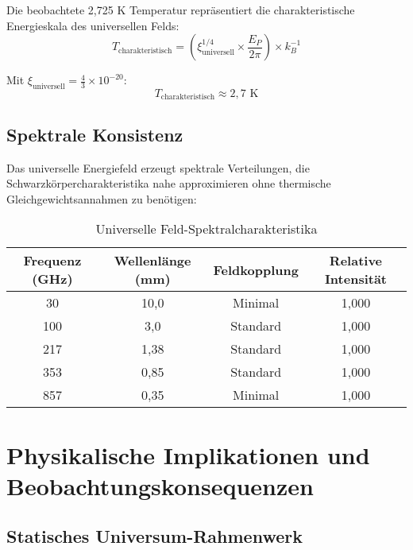 \documentclass[12pt,a4paper]{article}
\begin{document}
	Die beobachtete 2{,}725 K Temperatur repr\"asentiert die charakteristische Energieskala des universellen Felds:
	\begin{equation}
		T_{\text{charakteristisch}} = \left(\xi_{\text{universell}}^{1/4} \times \frac{E_P}{2\pi}\right) \times k_B^{-1}
	\end{equation}
	
	Mit $\xi_{\text{universell}} = \frac{4}{3} \times 10^{-20}$:
	\begin{equation}
		T_{\text{charakteristisch}} \approx 2{,}7 \text{ K}
	\end{equation}
	
	\subsection{Spektrale Konsistenz}
	\label{subsec:spectral_consistency}
	
	Das universelle Energiefeld erzeugt spektrale Verteilungen, die Schwarzk\"orpercharakteristika nahe approximieren ohne thermische Gleichgewichtsannahmen zu ben\"otigen:
	
	\begin{table}[htbp]
		\centering
		\begin{tabular}{|c|c|c|c|}
			\hline
			\textbf{Frequenz (GHz)} & \textbf{Wellenl\"ange (mm)} & \textbf{Feldkopplung} & \textbf{Relative Intensit\"at} \\
			\hline
			30 & 10{,}0 & Minimal & 1{,}000 \\
			100 & 3{,}0 & Standard & 1{,}000 \\
			217 & 1{,}38 & Standard & 1{,}000 \\
			353 & 0{,}85 & Standard & 1{,}000 \\
			857 & 0{,}35 & Minimal & 1{,}000 \\
			\hline
		\end{tabular}
		\caption{Universelle Feld-Spektralcharakteristika}
		\label{tab:field_spectrum}
	\end{table}
	
	\section{Physikalische Implikationen und Beobachtungskonsequenzen}
	\label{sec:physical_implications}
	
	\subsection{Statisches Universum-Rahmenwerk}
	\label{subsec:static_framework}
	
\end{document}
